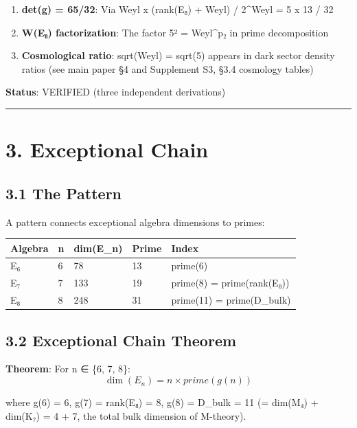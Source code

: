 \documentclass[11pt,a4paper]{article}
\begin{document}
\begin{enumerate}
\def\labelenumi{\arabic{enumi}.}
\tightlist
\item
  \textbf{det(g) = 65/32}: Via Weyl x (rank(E₈) + Weyl) / 2\^{}Weyl = 5 x 13 / 32
\item
  \textbf{\textbar W(E₈)\textbar{} factorization}: The factor 5² = Weyl\^{}p₂ in prime decomposition
\item
  \textbf{Cosmological ratio}: sqrt(Weyl) = sqrt(5) appears in dark sector density ratios (see main paper §4 and Supplement S3, §3.4 cosmology tables)
\end{enumerate}

\textbf{Status}: VERIFIED (three independent derivations)

\begin{center}\rule{\linewidth}{0.5pt}\end{center}

\section{3. Exceptional Chain}\label{exceptional-chain}

\subsection{3.1 The Pattern}\label{the-pattern}

A pattern connects exceptional algebra dimensions to primes:

\begin{longtable}[]{@{}lllll@{}}
\toprule\noalign{}
Algebra & n & dim(E\_\allowbreak{}n) & Prime & Index \\
\midrule\noalign{}
\endhead
\bottomrule\noalign{}
\endlastfoot
E₆ & 6 & 78 & 13 & prime(6) \\
E₇ & 7 & 133 & 19 & prime(8) = prime(rank(E₈)) \\
E₈ & 8 & 248 & 31 & prime(11) = prime(D\_\allowbreak{}bulk) \\
\end{longtable}

\subsection{3.2 Exceptional Chain Theorem}\label{exceptional-chain-theorem}

\textbf{Theorem}: For n ∈ \{6, 7, 8\}: \[\dim(E_n) = n \times prime(g(n))\]

where g(6) = 6, g(7) = rank(E₈) = 8, g(8) = D\_\allowbreak{}bulk = 11 (= dim(M₄) + dim(K₇) = 4 + 7, the total bulk dimension of M-theory).
\end{document}

